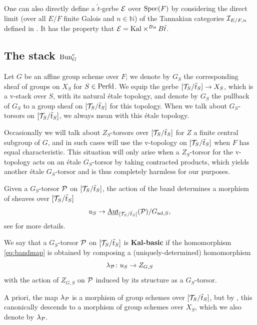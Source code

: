 \begin{rque}
    One can also directly define a $\tilde{t}$-gerbe $\mathcal{E}$ over $\mathrm{Spec}(F)$ by considering the direct limit (over all $E/F$ finite Galois and $n \in \mathbb{N}$) of the Tannakian categories $\mathcal{I}_{E/F,n}$ defined in \cite[\S 2.5]{BMD26}. It has the property that $\mathcal{E} = \mathrm{Kal} \times^{Bu} B\tilde{t}$.
\end{rque}

\subsection{The stack $\textnormal{Bun}_{G}^{e}$}
Let $G$ be an affine group scheme over $F$; we denote by $G_{S}$ the corresponding sheaf of groups on $X_{S}$ for $S \in \mathrm{Perfd}$. We equip the gerbe $[\mathcal{T}_{S}/\tilde{t}_{S}] \to X_{S}$, which is a v-stack over $S$, with its natural étale topology, and denote by $G_{S}$ the pullback of $G_{S}$ to a group sheaf on  $[\mathcal{T}_{S}/\tilde{t}_{S}]$ for this topology. When we talk about $G_{S}$-torsors on $[\mathcal{T}_{S}/\tilde{t}_{S}]$, we always mean with this \'{e}tale topology. 

\begin{rque} Occasionally we will talk about $Z_{S}$-torsors over $[\mathcal{T}_{S}/\tilde{t}_{S}]$ for $Z$ a finite central subgroup of $G$, and in such cases will use the v-topology on $[\mathcal{T}_{S}/\tilde{t}_{S}]$ when $F$ has equal characteristic. This situation will only arise when a $Z_{S}$-torsor for the v-topology acts on an \'{e}tale $G_{S}$-torsor by taking contracted products, which yields another \'{e}tale $G_{S}$-torsor and is thus completely harmless for our purposes.  
\end{rque}

Given a $G_{S}$-torsor $\mathcal{P}$ on  $[\mathcal{T}_{S}/\tilde{t}_{S}]$, the action of the band determines a morphism of sheaves over $[\mathcal{T}_{S}/\tilde{t}_{S}]$
\begin{equation}\label{eq:bandmap}
    u_{S} \to \underline{\textnormal{Aut}}_{[\mathcal{T}_{S}/\tilde{t}_{S}]}(\mathcal{P})/G_{\textnormal{ad},S},
\end{equation}
see \cite[Lemma 2.27]{Dillery23} for more details. 

\begin{defi}\label{defi:bandmap}
    We say that a $G_{S}$-torsor $\mathcal{P}$ on $[\mathcal{T}_{S}/\tilde{t}_{S}]$ is \textbf{Kal-basic} if the homomorphism \eqref{eq:bandmap} is obtained by composing a (uniquely-determined) homomorphism 
    \begin{equation*}
    \lambda_{\mathcal{P}} \colon u_{S} \to Z_{G,S}
    \end{equation*}
    with the action of $Z_{G,S}$ on $\mathcal{P}$ induced by its structure as a $G_{S}$-torsor.

    A priori, the map $\lambda_{\mathcal{P}}$ is a morphism of group schemes over $[\mathcal{T}_{S}/\tilde{t}_{S}]$, but by \cite[Lemma 2.42]{Dillery23}, this canonically descends to a morphism of group schemes over $X_{S}$, which we also denote by $\lambda_{\mathcal{P}}$.
\end{defi}

